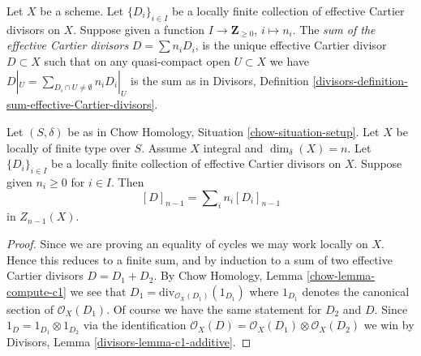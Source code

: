 \begin{definition}
\label{definition-locally-finite-sum-effective-Cartier-divisors}
Let $X$ be a scheme.
Let $\{D_i\}_{i \in I}$ be a locally finite collection
of effective Cartier divisors on $X$.
Suppose given a function
$I \to \mathbf{Z}_{\geq 0}$, $i \mapsto n_i$.
The {\it sum of the effective Cartier divisors}
$D = \sum n_i D_i$, is the unique effective Cartier divisor
$D \subset X$ such that on any quasi-compact open $U \subset X$
we have $D|_U = \sum_{D_i \cap U \not = \emptyset} n_iD_i|_U$
is the sum as in Divisors,
Definition \ref{divisors-definition-sum-effective-Cartier-divisors}.
\end{definition}

\begin{lemma}
\label{lemma-sum-divisors-associated-Weil}
Let $(S, \delta)$ be as in Chow Homology, Situation \ref{chow-situation-setup}.
Let $X$ be locally of finite type over $S$.
Assume $X$ integral and $\dim_\delta(X) = n$.
Let $\{D_i\}_{i \in I}$ be a locally finite collection
of effective Cartier divisors on $X$.
Suppose given $n_i \geq 0$ for $i \in I$.
Then
$$
[D]_{n - 1} = \sum\nolimits_i n_i[D_i]_{n - 1}
$$
in $Z_{n - 1}(X)$.
\end{lemma}

\begin{proof}
Since we are proving an equality of cycles we may work locally on $X$.
Hence this reduces to a finite sum, and by induction to a sum of
two effective Cartier divisors $D = D_1 + D_2$.
By Chow Homology, Lemma \ref{chow-lemma-compute-c1} we see that
$D_1 = \text{div}_{\mathcal{O}_X(D_1)}(1_{D_1})$ where
$1_{D_1}$ denotes the canonical section of $\mathcal{O}_X(D_1)$.
Of course we have the same statement for $D_2$ and $D$.
Since $1_D = 1_{D_1} \otimes 1_{D_2}$ via the identification
$\mathcal{O}_X(D) = \mathcal{O}_X(D_1) \otimes \mathcal{O}_X(D_2)$
we win by Divisors, Lemma \ref{divisors-lemma-c1-additive}.
\end{proof}

